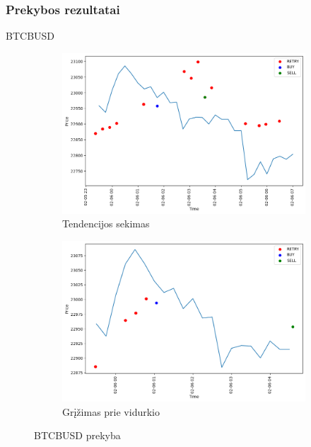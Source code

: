 \documentclass{VUMIFInfKursinis}
\begin{document}
\subsubsection{Prekybos rezultatai}
BTCBUSD
\begin{figure}[H]
  \centering
  \begin{subfigure}{.5\textwidth}
    \centering
    \includegraphics[width=\linewidth]{img/BTCBUSD_ARIMA_trades.png}
    \caption{Tendencijos sekimas}
    \label{fig:btcbusd_arima_trades}
  \end{subfigure}%
  \begin{subfigure}{.5\textwidth}
    \centering
    \includegraphics[width=\linewidth]{img/BTCBUSD_SMA_trades.png}
    \caption{Grįžimas prie vidurkio}
    \label{fig:btcbusd_sma_trades}
  \end{subfigure}
  \caption{BTCBUSD prekyba}
  \label{fig:btcbusd_trades}
\end{figure}
\end{document}
